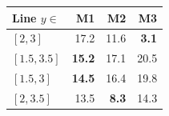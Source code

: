 \begin{tabular}{@{}l rrr@{}}
\toprule
Line $y\in$ & M1 & M2 & M3 \\
\midrule
$[2,3]$ & 17.2 & 11.6 & \textbf{3.1} \\
$[1.5,3.5]$ & \textbf{15.2} & 17.1 & 20.5 \\
$[1.5,3]$ & \textbf{14.5} & 16.4 & 19.8 \\
$[2,3.5]$ & 13.5 & \textbf{8.3} & 14.3 \\
\bottomrule
\end{tabular}
